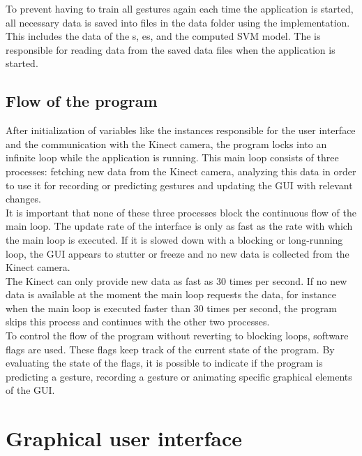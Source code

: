 To prevent having to train all gestures again each time the application is started, all necessary data is saved into files in the data folder using the  implementation. This includes the data of the s, es,  and the computed SVM model. The  is responsible for reading data from the saved data files when the application is started.\\


\subsection{Flow of the program}

After initialization of variables like the instances responsible for the user interface and the communication with the Kinect camera, the program locks into an infinite loop while the application is running. This main loop consists of three processes: fetching new data from the Kinect camera, analyzing this data in order to use it for recording or predicting gestures and updating the GUI with relevant changes.\\

It is important that none of these three processes block the continuous flow of the main loop. The update rate of the interface is only as fast as the rate with which the main loop is executed. If it is slowed down with a blocking or long-running loop, the GUI appears to stutter or freeze and no new data is collected from the Kinect camera.\\

The Kinect can only provide new data as fast as 30 times per second. If no new data is available at the moment the main loop requests the data, for instance when the main loop is executed faster than 30 times per second, the program skips this process and continues with the other two processes.\\

To control the flow of the program without reverting to blocking loops, software flags are used. These flags keep track of the current state of the program. By evaluating the state of the flags, it is possible to indicate if the program is predicting a gesture, recording a gesture or animating specific graphical elements of the GUI.


\section{Graphical user interface}

